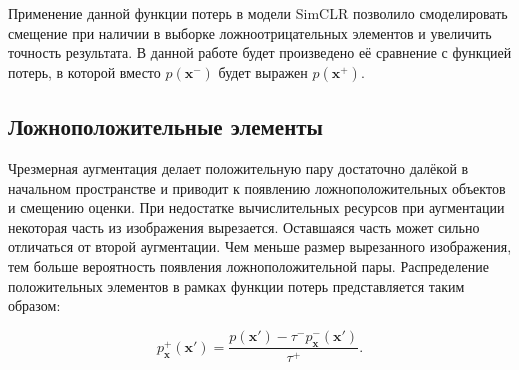 \documentclass[a4paper, 14pt]{article}
\begin{document}


Применение данной функции потерь в модели SimCLR позволило смоделировать смещение при наличии в выборке ложноотрицательных элементов и увеличить точность результата. В данной работе будет произведено её сравнение с функцией потерь, в которой вместо $p(\mathbf{x}^-)$ будет выражен $p(\mathbf{x}^+)$.

\subsection{Ложноположительные элементы}

Чрезмерная аугментация делает положительную пару достаточно далёкой в начальном пространстве и приводит к появлению ложноположительных объектов и смещению оценки. При недостатке вычислительных ресурсов при аугментации некоторая часть из изображения вырезается. Оставшаяся часть может сильно отличаться от второй аугментации. Чем меньше размер вырезанного изображения, тем больше вероятность появления ложноположительной пары. Распределение положительных элементов в рамках функции потерь представляется таким образом:

\begin{equation}\label{eq:7}
p_\mathbf{x}^+ (\textbf{x}') = \frac{p(\textbf{x}') - \tau^- p^-_\mathbf{x}(\textbf{x}')}{\tau^+}.
\end{equation}
\end{document}
